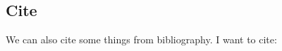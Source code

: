 \subsection{Cite}
We can also cite some things from bibliography. I want to cite: \cite{sim_models} \cite{aggr_timid_driv}



